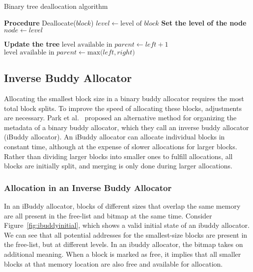 \begin{algorithm}
    \caption{Binary tree deallocation algorithm}
    \label{alg:btbuddy_dealloc}
    \begin{algorithmic}[1]
        \Statex \textbf{Procedure} Deallocate($block$)
        \State $level \gets \text{level of } block$
        \Statex \textbf{Set the level of the node}
        \State $node \gets level$

        \Statex \textbf{Update the tree}
        \State $\text{level available in } parent \gets left + 1$
        \Else
        \State $\text{level available in } parent \gets \text{max(}left,right\text{)}$
        \EndIf
        \EndFor
    \end{algorithmic}
\end{algorithm}

\newpage
\subsection{Inverse Buddy Allocator}
Allocating the smallest block size in a binary buddy allocator requires the most total block splits. To improve the speed of allocating these blocks, adjustments are necessary. Park et al.~\cite{park2014ibuddy} proposed an alternative method for organizing the metadata of a binary buddy allocator, which they call an inverse buddy allocator (iBuddy allocator). An iBuddy allocator can allocate individual blocks in constant time, although at the expense of slower allocations for larger blocks. Rather than dividing larger blocks into smaller ones to fulfill allocations, all blocks are initially split, and merging is only done during larger allocations.

\subsubsection{Allocation in an Inverse Buddy Allocator}
In an iBuddy allocator, blocks of different sizes that overlap the same memory are all present in the free-list and bitmap at the same time. Consider Figure~\ref{fig:ibuddyinitial}, which shows a valid initial state of an ibuddy allocator. We can see that all potential addresses for the smallest-size blocks are present in the free-list, but at different levels. In an ibuddy allocator, the bitmap takes on additional meaning. When a block is marked as free, it implies that all smaller blocks at that memory location are also free and available for allocation.

